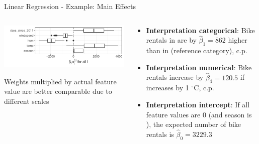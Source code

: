 \documentclass[11pt,compress,t,notes=noshow, aspectratio=169, xcolor=table]{beamer}
\begin{document}
\begin{frame}{Linear Regression - Example: Main Effects}
\begin{columns}[T, totalwidth=\linewidth]
\begin{column}{0.47\textwidth}

\includegraphics[width = \textwidth]{figure/plot_lin_effect.pdf}
  \begin{center}
    Weights multiplied by actual feature value are better comparable due to different scales
  \end{center}
%
\end{column}\hfill
\begin{column}{0.52\textwidth}  %

\begin{itemize}
    \item \textbf{Interpretation categorical}: Bike rentals in  are by $\hat\beta_1 = 862$ higher than in  (reference category), c.p.
    \item \textbf{Interpretation numerical}: Bike rentals increase by  $\hat\beta_4 = 120.5$ if  increases by 1 $^{\circ}$C, c.p.
    \item \textbf{Interpretation intercept}:
    If all feature values are 0 (and season is ), the expected number of bike rentals is $\hat\beta_0 = 3229.3$
\end{itemize}
\end{column}
\end{columns}
\end{frame}
\end{document}

